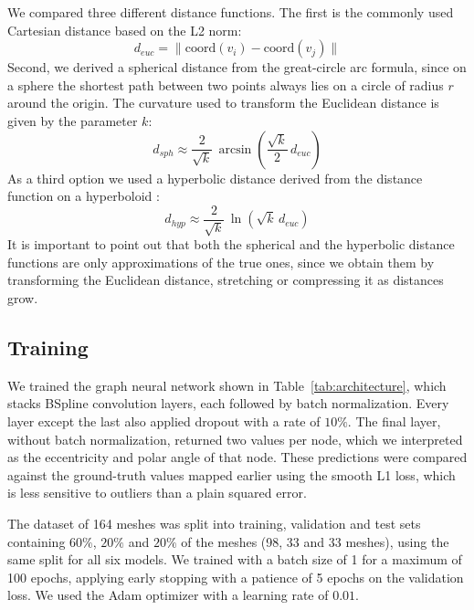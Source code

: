 We compared three different distance functions. The first is the commonly used Cartesian distance based on the L2 norm:
\begin{equation}
    d_{euc} = \lVert \mathrm{coord}(v_i) - \mathrm{coord}(v_j) \rVert
\end{equation}
Second, we derived a spherical distance from the great-circle arc formula, since on a sphere the shortest path between
two points always lies on a circle of radius $r$ around the origin. The curvature used to transform the Euclidean
distance is given by the parameter $k$:
\begin{equation}
    d_{sph} \approx \frac{2}{\sqrt{k}} \, \arcsin\!\left( \frac{\sqrt{k}}{2}\, d_{euc} \right)
\end{equation}
As a third option we used a hyperbolic distance derived from the distance function on a hyperboloid \cite{cannon1997hyperbolic}:
\begin{equation}
    d_{hyp} \approx \frac{2}{\sqrt{k}} \, \ln\!\left( \sqrt{k}\, d_{euc} \right)
\end{equation}
It is important to point out that both the spherical and the hyperbolic distance functions are only approximations of
the true ones, since we obtain them by transforming the Euclidean distance, stretching or compressing it as distances grow.

\subsection{Training}
We trained the graph neural network shown in Table~\ref{tab:architecture}, which stacks BSpline convolution
layers, each followed by batch normalization. Every layer except the last also applied dropout with a rate of
$10\%$. The final layer, without batch normalization, returned two values per node, which we interpreted as the
eccentricity and polar angle of that node. These predictions were compared against the ground-truth values
mapped earlier using the smooth L1 loss, which is less sensitive to outliers than a plain squared error.

The dataset of 164 meshes was split into training, validation and test sets containing $60\%$, $20\%$ and
$20\%$ of the meshes (98, 33 and 33 meshes), using the same split for all six models. We trained with a
batch size of 1 for a maximum of 100 epochs, applying early stopping with a patience of 5 epochs on the
validation loss. We used the Adam optimizer with a learning rate of $0.01$.

